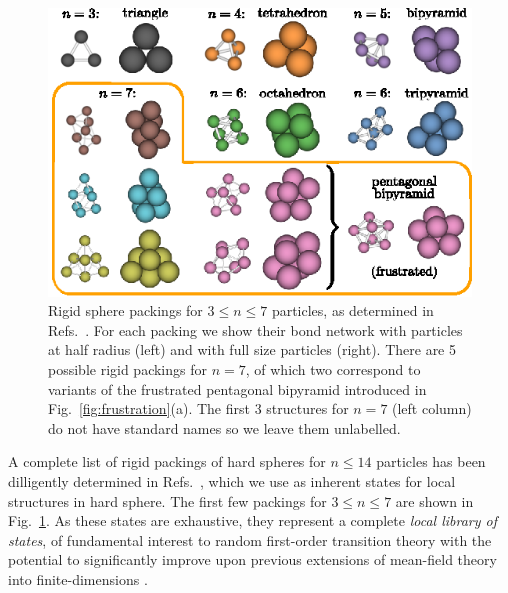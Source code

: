 \documentclass[11pt,twoside]{report}
\begin{document}
\begin{figure}
  \includegraphics[width=\linewidth,outer]{packings}
  \caption[Rigid spherical packings of up to 7 particles]{
    Rigid sphere packings for $3 \le n \le 7$ particles, as determined in Refs.\ \cite{ArkusPRL2009,Holmes-CerfonSR2016}.
    For each packing we show their bond network with particles at half radius (left) and with full size particles (right).
    There are 5 possible rigid packings for $n=7$, of which two correspond to variants of the frustrated pentagonal bipyramid introduced in Fig.\ \ref{fig:frustration}(a).
    The first 3 structures for $n=7$ (left column) do not have standard names so we leave them unlabelled.
  }
  \label{fig:packings}
\end{figure}

A complete list of rigid packings of hard spheres for $n \le 14$ particles has been dilligently determined in Refs.\ \cite{ArkusPRL2009,ArkusSJDM2011,Holmes-CerfonSR2016,Holmes-CerfonARCMP2017}, which we use as inherent states for local structures in hard sphere.
The first few packings for $3 \le n \le 7$ are shown in Fig.\ \ref{fig:packings}.
As these states are exhaustive, they represent a complete \emph{local library of states}, of fundamental interest to random first-order transition theory \cite{LubchenkoARPC2007} with the potential to significantly improve upon previous extensions of mean-field theory into finite-dimensions \cite{KirkpatrickPRB1987,HallJCP1987,KirkpatrickPRA1989,BouchaudJCP2004,DzeroPRB2005,FranzJSM2005,AngeliniJSP2017,RulquinJSM2016,BiroliMeanPRB2018,BiroliFinitePRB2018}.
\end{document}
